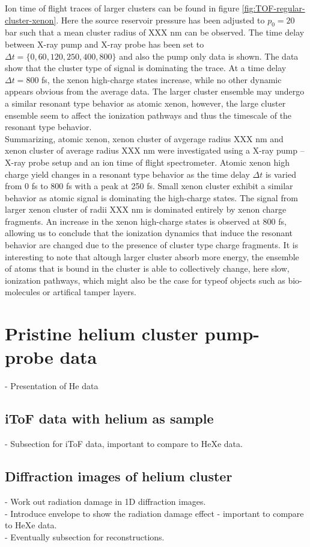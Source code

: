 Ion time of flight traces of larger clusters can be found in figure \ref{fig:TOF-regular-cluster-xenon}. Here the source reservoir pressure has been adjusted to $p_{0}=20$ bar such that a mean cluster radius of XXX nm can be observed. The time delay between X-ray pump and X-ray probe has been set to $\Delta t=\{0,60,120,250,400,800\}$ and also the pump only data is shown. The data show that the cluster type of signal is dominating the trace. At a time delay $\Delta t=800$ fs, the xenon high-charge states increase, while no other dynamic appears obvious from the average data. The larger cluster ensemble may undergo a similar resonant type behavior as atomic xenon, however, the large cluster ensemble seem to affect the ionization pathways and thus the timescale of the resonant type behavior.\\
Summarizing, atomic xenon, xenon cluster of avgerage radius XXX nm and xenon cluster of average radius XXX nm were investigated using a X-ray pump -- X-ray probe setup and an ion time of flight spectrometer. Atomic xenon high charge yield changes in a resonant type behavior as the time delay $\Delta t$ is varied from 0 fs to 800 fs with a peak at 250 fs. Small xenon cluster exhibit a similar behavior as atomic signal is dominating the high-charge states. The signal from larger xenon cluster of radii XXX nm is dominated entirely by xenon charge fragments. An increase in the xenon high-charge states is observed at 800 fs, allowing us to conclude that the ionization dynamics that induce the resonant behavior are changed due to the presence of cluster type charge fragments. It is interesting to note that altough larger cluster absorb more energy, the ensemble of atoms that is bound in the cluster is able to collectively change, here slow, ionization pathways, which might also be the case for typeof objects such as bio-molecules or artifical tamper layers.
%
%
%
\section{Pristine helium cluster pump-probe data}\label{sec:helium-data}
- Presentation of He data
\subsection{iToF data with helium as sample}
- Subsection for iToF data, important to compare to HeXe data.
\subsection{Diffraction images of helium cluster}
- Work out radiation damage in 1D diffraction images.\\
- Introduce envelope to show the radiation damage effect - important to compare to HeXe data.\\
- Eventually subsection for reconstructions.
%
%
%
